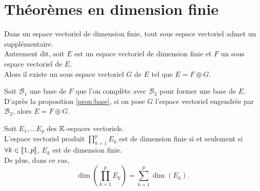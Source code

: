 \documentclass{book}
\begin{document}
\section{Théorèmes en dimension finie}
\begin{Proposition}
Dans un espace vectoriel de dimension finie, tout sous espace vectoriel admet un supplémentaire.\\
Autrement dit, soit $E$ est un espace vectoriel de dimension finie et $F$ un sous espace vectoriel de $E$.\\
Alors il existe un sous espace vectoriel $G$ de $E$ tel que $E = F \oplus G$.
\end{Proposition}
\begin{Demonstration}
Soit $\mathcal{B}_1$ une base de $F$ que l'on complète avec $\mathcal{B}_2$ pour former une base de $E$.\\
D'après la proposition \ref{prop:base}, si on pose $G$ l'espace vectoriel engendrée par  $\mathcal{B}_2$, alors $E = F \oplus G$.  
\end{Demonstration}
\begin{Proposition}
Soit $E_1,\dots E_p$ des $\mathbb{K} $-espaces vectoriels.\\
L'espace vectoriel produit $\prod_{k=1}^p E_k$ est de dimension finie si et seulement si $\forall k\in \mathopen\lbrack\!\lbrack1,p \mathclose\rbrack\!\rbrack$, $E_k$ est de dimension finie.\\
De plus, dans ce cas, \[ \dim( \prod_{k=1}^p E_k ) = \sum_{k=1}^p \dim(E_k). \]
\end{Proposition}
\end{document}
